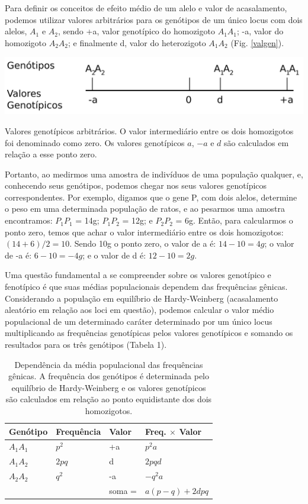 \documentclass[portuges,]{tufte-handout}
\begin{document}
Para definir os conceitos de efeito médio de um alelo e valor de
acasalamento, podemos utilizar valores arbitrários para os genótipos de
um único locus com dois alelos, $A_1$ e $A_2$, sendo +a, valor
genotípico do homozigoto $A_1$$A_1$; -a, valor do homozigoto $A_2$$A_2$;
e finalmente d, valor do heterozigoto $A_1$$A_2$ (Fig. \ref{valgen}).

\begin{marginfigure}
\includegraphics{./figuras/valoresgenotipicos.png}
\caption{Valores genotípicos arbitrários. O valor intermediário
entre os dois homozigotos foi denominado como zero. Os valores
genotípicos \(a\), \(-a\) e \(d\) são calculados em relação a esse ponto
zero.}
\label{valgen}
\end{marginfigure}

Portanto, ao medirmos uma amostra de indivíduos de uma população
qualquer, e, conhecendo seus genótipos, podemos chegar nos seus valores
genotípicos correspondentes. Por exemplo, digamos que o gene P, com dois
alelos, determine o peso em uma determinada população de ratos, e ao
pesarmos uma amostra encontramos: $P_1$$P_1$ = 14g; $P_1$$P_2$ = 12g; e
$P_2$$P_2$ = 6g. Então, para calcularmos o ponto zero, temos que achar o
valor intermediário entre os dois homozigotos: $(14 + 6)/2 = 10$. Sendo
10g o ponto zero, o valor de a é: $14-10 = 4g$; o valor de -a é:
$6-10 = -4g$; e o valor de d é: $12-10 = 2g$.

Uma questão fundamental a se compreender sobre os valores genotípico e
fenotípico é que suas médias populacionais dependem das frequências
gênicas. Considerando a população em equilíbrio de Hardy-Weinberg
(acasalamento aleatório em relação aos loci em questão), podemos
calcular o valor médio populacional de um determinado caráter
determinado por um único locus multiplicando as frequências genotípicas
pelos valores genotípicos e somando os resultados para os três genótipos
(Tabela 1).

\begin{table}
  \centering
  \selectfont
  \caption{Dependência da média populacional das frequências
gênicas. A frequência dos genótipos é determinada pelo equilíbrio
de Hardy-Weinberg e os valores genotípicos são calculados em relação
ao ponto equidistante dos dois homozigotos.}
  \begin{tabular}{llll}
    \toprule
  Genótipo  &  Frequência   &  Valor   &   Freq. $\times$ Valor \\
    \midrule
 $A_1A_1$   &       $p^2$   &        +a &        $p^2a$ \\
 $A_1A_2$   &       $2pq$   &         d &        $2pqd$ \\
 $A_2A_2$   &       $q^2$   &        -a &        $-q^2a$ \\
            &               &   soma =  &   $a(p-q)+2dpq$ \\
    \bottomrule
  \end{tabular}
\end{table}
\end{document}
